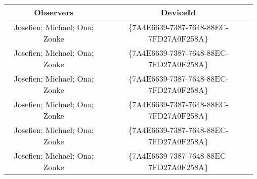 \documentclass[
]{article}
\begin{document}
\begin{longtable}[]{@{}cc@{}}
\toprule
Observers & DeviceId \\
\midrule
\endhead
Josefien; Michael; Ona; Zonke &
\{7A4E6639-7387-7648-88EC-7FD27A0F258A\} \\
Josefien; Michael; Ona; Zonke &
\{7A4E6639-7387-7648-88EC-7FD27A0F258A\} \\
Josefien; Michael; Ona; Zonke &
\{7A4E6639-7387-7648-88EC-7FD27A0F258A\} \\
Josefien; Michael; Ona; Zonke &
\{7A4E6639-7387-7648-88EC-7FD27A0F258A\} \\
Josefien; Michael; Ona; Zonke &
\{7A4E6639-7387-7648-88EC-7FD27A0F258A\} \\
Josefien; Michael; Ona; Zonke &
\{7A4E6639-7387-7648-88EC-7FD27A0F258A\} \\
\bottomrule
\end{longtable}
\end{document}
